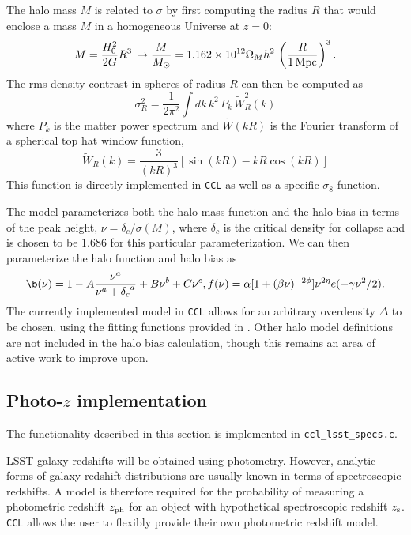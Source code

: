 \documentclass[\docopts]{\docclass}
\begin{document}
The halo mass $M$ is related to $\sigma$ by first computing the radius $R$ that would enclose a mass $M$ in a homogeneous Universe at $z=0$:
\begin{equation}
  M=\frac{H_0^2}{2G}R^3\,\rightarrow \frac{M}{M_\odot}=1.162\times10^{12}\Omega_Mh^2\,\left(\frac{R}{1\,{\rm Mpc}}\right)^3.
\end{equation}
The rms density contrast in spheres of radius $R$ can then be computed as
\begin{equation}
  \sigma_R^2 = \frac{1}{2\pi^2}\int dk\,k^2\,P_k\,\tilde{W}_R^2(k)
  \label{eq:sigR}
\end{equation}
where $P_k$ is the matter power spectrum and $\tilde{W}(kR)$ is the Fourier transform of a spherical top hat window function,
\begin{equation}
\tilde{W}_R(k) = \frac{3}{(kR)^3}[\sin(kR)-kR\cos(kR)]
\end{equation}
%
This function is directly implemented in {\tt CCL} as well as a specific $\sigma_8$ function.

The \citet{Tinker2010} model parameterizes both the halo mass function and the halo bias in terms of the peak height, $\nu = \delta_c / \sigma(M)$, where $\delta_c$ is the critical density for collapse and is chosen to be $1.686$ for this particular parameterization. We can then parameterize the halo function and halo bias as
\begin{equation}
  \b(\nu) = 1 - A\frac{\nu^a}{\nu^a + {\delta_c}^a} + B\nu^b+C\nu^c,
  f(\nu) = \alpha[1+(\beta\nu)^{-2\phi}]\nu^{2\eta}e(-\gamma\nu^2/2).
\end{equation}
The currently implemented model in {\tt CCL} allows for an arbitrary overdensity $\Delta$ to be chosen, using the fitting functions provided in \citet{Tinker2010}. Other halo model definitions are not included in the halo bias calculation, though this remains an area of active work to improve upon.

\subsection{Photo-$z$ implementation}
\label{sec:photoz}
The functionality described in this section is implemented in {\tt ccl\_lsst\_specs.c}.

LSST galaxy redshifts will be obtained using photometry. However, analytic forms of galaxy redshift distributions are usually known in terms of spectroscopic redshifts. A model is therefore required for the probability of measuring a photometric redshift $z_{\rm ph}$ for an object with hypothetical spectroscopic redshift $z_{\rm s}$. {\tt CCL} allows the user to flexibly provide their own photometric redshift model.
\end{document}
